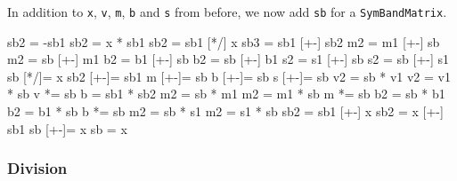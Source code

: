 \documentclass[twoside,letterpaper,11pt]{article}
\renewcommand{\tt}[1]{{\lstinline {#1}}}
\begin{document}
In addition to \tt{x}, \tt{v}, \tt{m}, \tt{b} and \tt{s} from before, 
we now add \tt{sb} for a \tt{SymBandMatrix}.

\begin{tmvcode}
sb2 = -sb1
sb2 = x * sb1
sb2 = sb1 [*/] x
sb3 = sb1 [+-] sb2
m2 = m1 [+-] sb
m2 = sb [+-] m1
b2 = b1 [+-] sb
b2 = sb [+-] b1
s2 = s1 [+-] sb
s2 = sb [+-] s1
sb [*/]= x
sb2 [+-]= sb1
m [+-]= sb
b [+-]= sb
s [+-]= sb
v2 = sb * v1
v2 = v1 * sb
v *= sb
b = sb1 * sb2
m2 = sb * m1
m2 = m1 * sb
m *= sb
b2 = sb * b1
b2 = b1 * sb
b *= sb
m2 = sb * s1
m2 = s1 * sb
sb2 = sb1 [+-] x
sb2 = x [+-] sb1
sb [+-]= x
sb = x
\end{tmvcode}

\subsubsection{Division}
\end{document}

